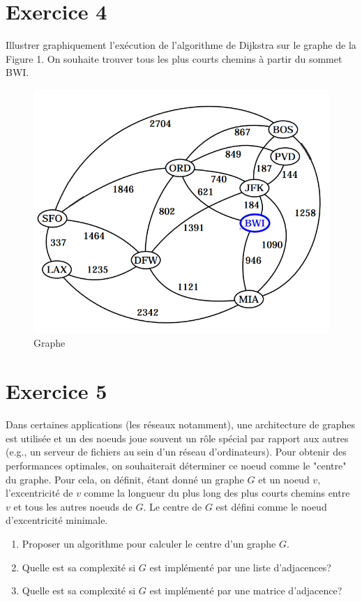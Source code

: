 \documentclass[a4paper,10pt]{article}
\begin{document}
\section*{Exercice 4}

Illustrer graphiquement l'exécution de l'algorithme de Dijkstra sur le graphe de la Figure 1. On souhaite trouver tous les plus courts chemins à partir du sommet BWI.

\begin{figure}
    \center
    \includegraphics[scale=0.5]{graphe.png}
    \caption{Graphe}
\end{figure}

\section*{Exercice 5}

Dans certaines applications (les réseaux notamment), une architecture de graphes
est utilisée et un des noeuds joue souvent un rôle spécial par rapport aux
autres (e.g., un serveur de fichiers au sein d'un réseau d'ordinateurs). Pour
obtenir des performances optimales, on souhaiterait déterminer ce noeud comme le
"centre" du graphe. Pour cela, on définit, étant donné un graphe $G$ et un noeud
$v$, l'excentricité de $v$ comme la longueur du plus long des plus courts
chemins entre $v$ et tous les autres noeuds de $G$. Le centre de $G$ est défini
comme le noeud d'excentricité minimale.

\begin{enumerate}
\item Proposer un algorithme pour calculer le centre d'un graphe $G$.
\item Quelle est sa complexité si $G$ est implémenté par une liste d'adjacences?
\item  Quelle est sa complexité si $G$ est implémenté par une matrice d'adjacence?
\end{enumerate}
\end{document}
